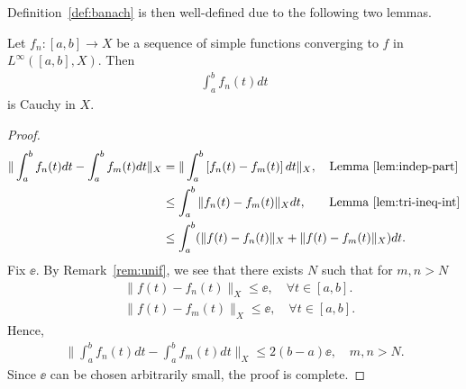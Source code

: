 %
%
%
%
%
%
%
%
%
Definition~\ref{def:banach} is then well-defined due to the following two
lemmas.
%
%
%
%
%
%
%
%
%
%
\begin{lemma}[Convergence] Let $f_{n}: [a,b] \to X$ be a sequence of simple
  functions converging to $f$ in $L^{\infty}([a,b], X)$. Then
  \begin{equation*}
  \begin{split}
    \int_{a}^{b}f_{n}(t) dt
  \end{split}
  \end{equation*}
  is Cauchy in $X$. 
\label{lem:conv}
\end{lemma}
%
%
%
%
\begin{proof}
  \begin{equation}
    \begin{split}
  \| \int_{a}^{b} f_{n}(t) dt - \int_{a}^{b} f_{m}(t) dt \|_{X}
  & = \| \int_{a}^{b}\left[ f_{n}(t) - f_{m}(t) \right]dt \|_{X}, \quad \text{Lemma~\ref{lem:indep-part}}
  \\
  & \le \int_{a}^{b} \| f_{n}(t) - f_{m}(t) \|_{X} dt,
  \quad \phantom{m} \text{Lemma~\ref{lem:tri-ineq-int}}
  \\
  & \le \int_{a}^{b} (\| f(t) - f_{n}(t) \|_{X} + \| f(t) - f_{m}(t) \|_{X})dt.
\end{split}
\end{equation}
%
Fix $\ee$. By Remark~\ref{rem:unif}, we see that there exists $N$ such
that for $m, n > N$
%
%
\begin{equation*}
\begin{split}
& \| f(t) - f_{n}(t) \|_{X} \le \ee, \quad \forall t \in [a, b].
\\
& \| f(t) - f_{m}(t) \|_{X} \le \ee, \quad \forall t \in [a, b].
\end{split}
\end{equation*}
Hence,
%
%
\begin{equation*}
\begin{split}
\| \int_{a}^{b} f_{n}(t) dt - \int_{a}^{b} f_{m}(t) dt \|_{X} \le 2(b-a) \ee,
\quad m,n > N.
\end{split}
\end{equation*}
%
Since $\ee$ can be chosen arbitrarily small, the proof is complete.
\end{proof}
%
